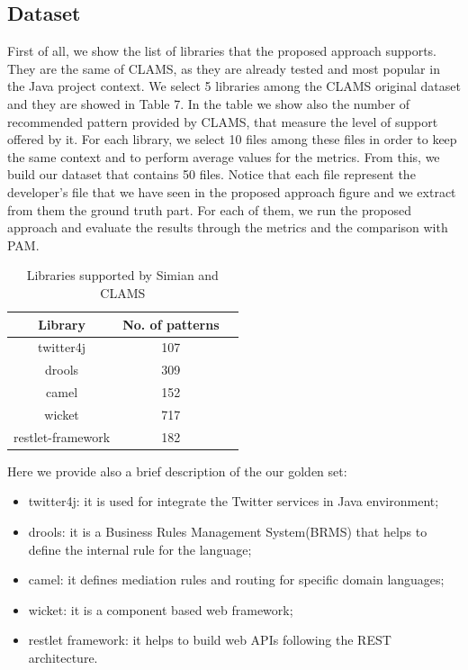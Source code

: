 \subsection{Dataset}
First of all, we show the list of libraries that the proposed approach supports. They are the same of CLAMS, as they are already tested and most popular in the Java project context. We select 5 libraries among the CLAMS original dataset and they are showed in Table 7. In the table we show also the number of recommended pattern provided by CLAMS, that measure the level of support offered by it. For each library, we select 10 files among these files in order to keep the same context and to perform average values for the metrics. From this, we build our dataset that contains 50 files. Notice that each file represent the developer's file that we have seen in the proposed approach figure and we extract from them the ground truth part. For each of them, we run the proposed approach and evaluate the results through the metrics and the comparison with PAM.
\begin{table}[H]
  \caption{ Libraries supported by Simian and CLAMS }
  \label{Table:7}
 \begin{center}

\begin{tabular}{|c|c|c|}

\hline
 \textbf{Library} & \textbf{No. of patterns}  \\
\hline
 twitter4j &  107   \\
\hline
drools & 309 \\
\hline
camel & 152  \\
\hline 
wicket & 717  \\
\hline
restlet-framework & 182  \\
\hline
\end{tabular}
\end{center}
\end{table} 
Here we provide also a brief description of the our golden set:
\begin{itemize}
\item twitter4j: it is used for integrate the Twitter services in Java environment;
\item drools: it is a Business Rules Management System(BRMS) that helps to define the internal rule for the language;
\item camel: it defines mediation rules and routing for specific domain languages;
\item wicket: it is a component based web framework;
\item restlet framework: it helps to build web APIs following the REST architecture. 
\end{itemize}




